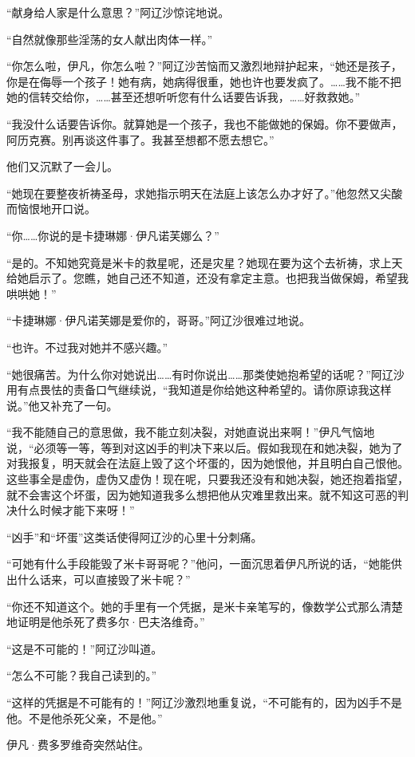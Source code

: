 \par “献身给人家是什么意思？”阿辽沙惊诧地说。
\par “自然就像那些淫荡的女人献出肉体一样。”
\par “你怎么啦，伊凡，你怎么啦？”阿辽沙苦恼而又激烈地辩护起来，“她还是孩子，你是在侮辱一个孩子！她有病，她病得很重，她也许也要发疯了。……我不能不把她的信转交给你，……甚至还想听听您有什么话要告诉我，……好救救她。”
\par “我没什么话要告诉你。就算她是一个孩子，我也不能做她的保姆。你不要做声，阿历克赛。别再谈这件事了。我甚至想都不愿去想它。”
\par 他们又沉默了一会儿。
\par “她现在要整夜祈祷圣母，求她指示明天在法庭上该怎么办才好了。”他忽然又尖酸而恼恨地开口说。
\par “你……你说的是卡捷琳娜·伊凡诺芙娜么？”
\par “是的。不知她究竟是米卡的救星呢，还是灾星？她现在要为这个去祈祷，求上天给她启示了。您瞧，她自己还不知道，还没有拿定主意。也把我当做保姆，希望我哄哄她！”
\par “卡捷琳娜·伊凡诺芙娜是爱你的，哥哥。”阿辽沙很难过地说。
\par “也许。不过我对她并不感兴趣。”
\par “她很痛苦。为什么你对她说出……有时你说出……那类使她抱希望的话呢？”阿辽沙用有点畏怯的责备口气继续说，“我知道是你给她这种希望的。请你原谅我这样说。”他又补充了一句。
\par “我不能随自己的意思做，我不能立刻决裂，对她直说出来啊！”伊凡气恼地说，“必须等一等，等到对这凶手的判决下来以后。假如我现在和她决裂，她为了对我报复，明天就会在法庭上毁了这个坏蛋的，因为她恨他，并且明白自己恨他。这些事全是虚伪，虚伪又虚伪！现在呢，只要我还没有和她决裂，她还抱着指望，就不会害这个坏蛋，因为她知道我多么想把他从灾难里救出来。就不知这可恶的判决什么时候才能下来呀！”
\par “凶手”和“坏蛋”这类话使得阿辽沙的心里十分刺痛。
\par “可她有什么手段能毁了米卡哥哥呢？”他问，一面沉思着伊凡所说的话，“她能供出什么话来，可以直接毁了米卡呢？”
\par “你还不知道这个。她的手里有一个凭据，是米卡亲笔写的，像数学公式那么清楚地证明是他杀死了费多尔·巴夫洛维奇。”
\par “这是不可能的！”阿辽沙叫道。
\par “怎么不可能？我自己读到的。”
\par “这样的凭据是不可能有的！”阿辽沙激烈地重复说，“不可能有的，因为凶手不是他。不是他杀死父亲，不是他。”
\par 伊凡·费多罗维奇突然站住。
